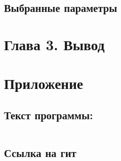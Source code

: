\documentclass[12pt,a4paper]{extarticle}
\begin{document}
\subsection{Выбранные параметры}

\section{Глава 3. Вывод}



\newpage
\section*{Приложение}
\subsection*{Текст программы:}
\begin{lstlisting}[language=C++]

\end{lstlisting}
\subsection*{Ссылка на гит}
\end{document}
